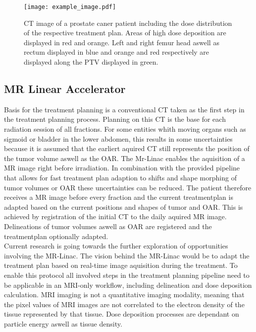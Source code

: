 \begin{figure}
    \centering
    \texttt{[image: example\_image.pdf]}
    \caption{
        CT image of a prostate caner patient including the dose distribution of the respective treatment plan. Areas of high dose deposition are displayed in red and orange. Left and right femur head aswell as rectum displayed in blue and orange and red respectively are displayed along the \acs{PTV} displayed in green.
        }\label{fig:prostate_oar}
\end{figure}

\subsection{MR Linear Accelerator}

Basis for the treatment planning is a conventional \acs{CT} taken as the first step in the treatment planning process.
Planning on this \acs{CT} is the base for each radiation session of all fractions.
For some entities whith moving organs such as sigmoid or bladder in the lower abdomen, this results in some uncertainties because it is assumed that the earliert aquired \acs{CT} still represents the position of the tumor volume aswell as the \acs{OAR}.
The Mr-Linac enables the aquisition of a MR image right before irradiation.
In combination with the provided pipeline that allows for fast treatment plan adaption to shifts and shape morphing of tumor volumes or \acs{OAR} these uncertainties can be reduced. 
The patient therefore receives a MR image before every fraction and the current treatmentplan is adapted based on the current positions and shapes of tumor and \acs{OAR}.
This is achieved by registration of the initial CT to the daily aquired MR image.
Delineations of tumor volumes aswell as \acs{OAR} are registered and the treatmentplan optionally adapted.\\
Current research is going towards the further exploration of opportunities involving the MR-Linac.
The vision behind the MR-Linac would be to adapt the treatment plan based on real-time image aquisition during the treatment.
To enable this protocol all involved steps in the treatment planning  pipeline need to be applicable in an MRI-only workflow, including delineation and dose deposition calculation.
MRI imaging is not a quantitative imaging modality, meaning that the pixel values of MRI images are not correlated to the electron density of the tissue represented by that tissue.
Dose deposition processes are dependant on particle energy aswell as tissue density.
